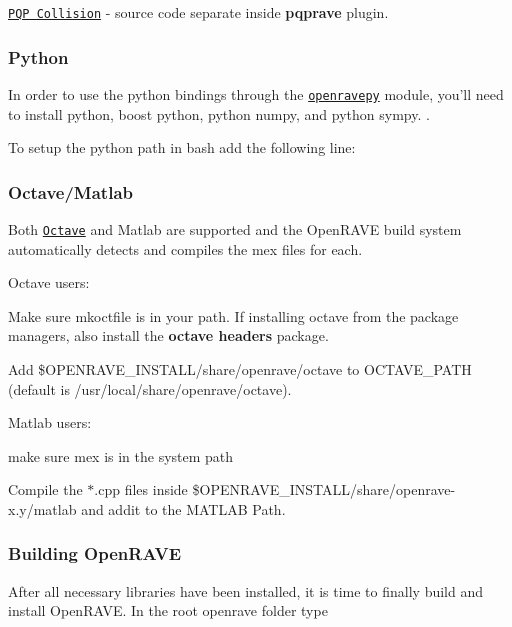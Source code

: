 \begin{DoxyItemize}
\item \href{http://www.cs.unc.edu/~geom/SSV/}{\tt PQP Collision} -\/ source code separate inside {\bfseries pqprave} plugin.
\end{DoxyItemize}\hypertarget{installation__linux_ilinux_python}{}\subsubsection{Python}\label{installation__linux_ilinux_python}
In order to use the python bindings through the \href{http://openrave.org/en/main/tutorials/openravepy_beginning.html#openravepy-beginning}{\tt openravepy} module, you'll need to install python, boost python, python numpy, and python sympy. .

To setup the python path in bash add the following line:

\hypertarget{installation__linux_ilinux_octavematlab}{}\subsubsection{Octave/Matlab}\label{installation__linux_ilinux_octavematlab}
Both \href{http://www.gnu.org/software/octave/}{\tt Octave} and Matlab are supported and the OpenRAVE build system automatically detects and compiles the mex files for each.

Octave users:
\begin{DoxyItemize}
\item Make sure {\ttfamily mkoctfile} is in your path. If installing octave from the package managers, also install the {\bfseries octave headers} package.
\item Add {\ttfamily \$OPENRAVE\_\-INSTALL/share/openrave/octave} to OCTAVE\_\-PATH (default is {\ttfamily /usr/local/share/openrave/octave}).
\end{DoxyItemize}

Matlab users:
\begin{DoxyItemize}
\item make sure {\ttfamily mex} is in the system path
\item Compile the $\ast$.cpp files inside {\ttfamily \$OPENRAVE\_\-INSTALL/share/openrave-\/x}.y/matlab and addit to the MATLAB Path.
\end{DoxyItemize}\hypertarget{installation__linux_ilinux_building}{}\subsubsection{Building OpenRAVE}\label{installation__linux_ilinux_building}
After all necessary libraries have been installed, it is time to finally build and install OpenRAVE. In the root openrave folder type

